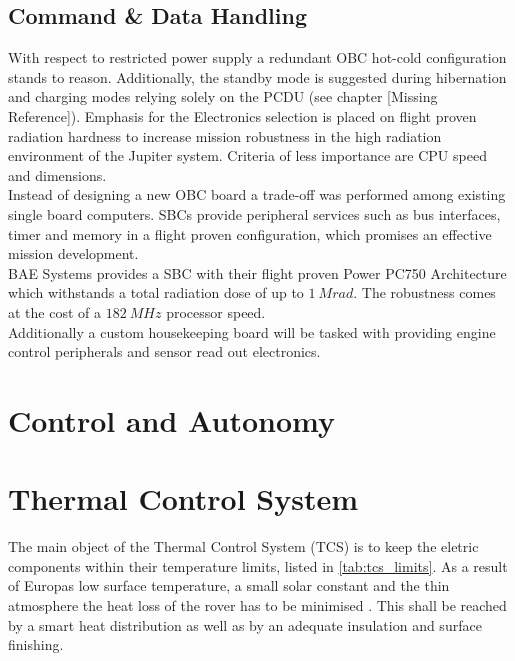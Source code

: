  \subsection{Command \& Data Handling}
 
 With respect to restricted power supply a redundant OBC hot-cold configuration stands to reason. Additionally, the standby mode is suggested during hibernation and charging modes relying solely on the PCDU (see chapter [Missing Reference]). 
Emphasis for the Electronics selection is placed on flight proven radiation hardness to increase mission robustness in the high radiation environment of the Jupiter system. 
Criteria of less importance are CPU speed and dimensions. \\

Instead of designing a new OBC board a trade-off was performed among existing single board computers. SBCs provide peripheral services such as bus interfaces, timer and memory in a flight proven configuration, which promises an effective mission development. \\

BAE Systems provides a SBC with their flight proven Power PC750 Architecture which withstands a total radiation dose of up to $1\ Mrad$. The robustness comes at the cost of a $182\ MHz$ processor speed. \\

Additionally a custom housekeeping board will be tasked with providing engine control peripherals and sensor read out electronics. 
 
\clearpage

\section{Control and Autonomy} \label{sec:ControlandAutonomy}

\clearpage

\section{Thermal Control System} \label{sec:thermalcontrol}
The main object of the Thermal Control System (TCS) is to keep the eletric components within their temperature limits, listed in \autoref{tab:tcs_limits}.
As a result of Europas low surface temperature, a small solar constant and the thin atmosphere the heat loss of the rover has to be minimised  \cite{Europa}.
This shall be reached by a smart heat distribution as well as by an adequate insulation and surface finishing.

